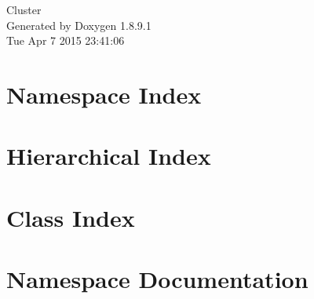\documentclass[twoside]{book}
\newcommand{\+}{\discretionary{\mbox{\scriptsize$\hookleftarrow$}}{}{}}
\newcommand{\clearemptydoublepage}{%
  \newpage{\pagestyle{empty}\cleardoublepage}%
}
\begin{document}
\hypersetup{pageanchor=false,
             bookmarks=true,
             bookmarksnumbered=true,
             pdfencoding=unicode
            }
\begin{titlepage}
\vspace*{7cm}
\begin{center}%
{\Large Cluster }\\
\vspace*{1cm}
{\large Generated by Doxygen 1.8.9.1}\\
\vspace*{0.5cm}
{\small Tue Apr 7 2015 23:41:06}\\
\end{center}
\end{titlepage}
\clearemptydoublepage
\tableofcontents
\clearemptydoublepage
{}
\hypersetup{pageanchor=true}

\chapter{Namespace Index}

\chapter{Hierarchical Index}

\chapter{Class Index}

\chapter{Namespace Documentation}









\end{document}

